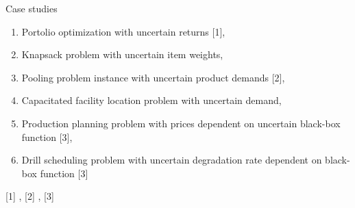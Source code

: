 \documentclass[slides,aspectratio=169]{beamer}
\begin{document}
\begin{frame}{Case studies}
    \begin{enumerate}
        \item Portolio optimization with uncertain returns [1],
        \item Knapsack problem with uncertain item weights,
        \item Pooling problem instance with uncertain product demands [2],
        \item Capacitated facility location problem with uncertain demand,
        \item Production planning problem with prices dependent on uncertain
            black-box function [3],
        \item Drill scheduling problem with uncertain degradation rate
            dependent on black-box function [3]
    \end{enumerate}
    \small
    [1] \cite{Bertsimas2004}, [2] \cite{adhya}, [3] \cite{Wiebe2020}
\end{frame}
\end{document}
